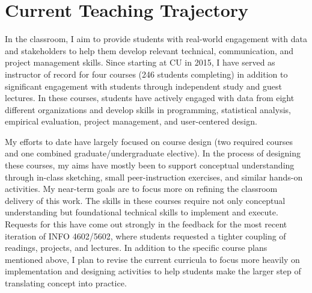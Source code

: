 \documentclass[11pt]{article}
\begin{document}

\section*{Current Teaching Trajectory}

In the classroom, I aim to provide students with real-world engagement with data and stakeholders to help them develop relevant technical, communication, and project management skills. Since starting at CU in 2015, I have served as instructor of record for four courses (246 students completing) in addition to significant engagement with students through independent study and guest lectures. In these courses, students have actively engaged with data from eight different organizations and develop skills in programming, statistical analysis, empirical evaluation, project management, and user-centered design.

My efforts to date have largely focused on course design (two required courses and one combined graduate/undergraduate elective). In the process of designing these courses, my aims have mostly been to support conceptual understanding through in-class sketching, small peer-instruction exercises, and similar hands-on activities. My near-term goals are to focus more on refining the classroom delivery of this work. The skills in these courses require not only conceptual understanding but foundational technical skills to implement and execute. Requests for this have come out strongly in the feedback for the most recent iteration of INFO 4602/5602, where students requested a tighter coupling of readings, projects, and lectures. In addition to the specific course plans mentioned above, I plan to revise the current curricula to focus more heavily on implementation and designing activities to help students make the larger step of translating concept into practice. 


\pagebreak
\setcounter{page}{1}
\end{document}
